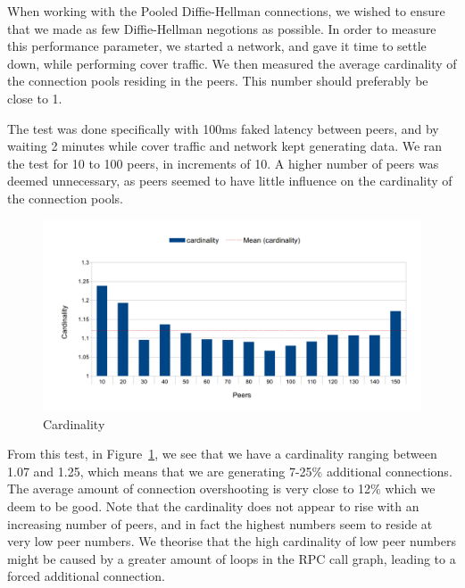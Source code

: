 When working with the Pooled Diffie-Hellman connections, we wished to ensure that we made as few Diffie-Hellman negotions as possible. In order to measure this performance parameter, we started a network, and gave it time to settle down, while performing cover traffic. We then measured the average cardinality of the connection pools residing in the peers. This number should preferably be close to 1.

The test was done specifically with 100ms faked latency between peers, and by waiting 2 minutes while cover traffic and network kept generating data. We ran the test for 10 to 100 peers, in increments of 10. A higher number of peers was deemed unnecessary, as peers seemed to have little influence on the cardinality of the connection pools.

\begin{figure}
\caption{Cardinality}
\label{graph_cardinality}
\includegraphics[width=\textwidth]{../Grapes/DH_pools_cardinality_graph.png}
\end{figure}

From this test, in Figure~\ref{graph_cardinality}, we see that we have a cardinality ranging between 1.07 and 1.25, which means that we are generating 7-25\% additional connections. The average amount of connection overshooting is very close to 12\% which we deem to be good. Note that the cardinality does not appear to rise with an increasing number of peers, and in fact the highest numbers seem to reside at very low peer numbers. We theorise that the high cardinality of low peer numbers might be caused by a greater amount of loops in the RPC call graph, leading to a forced additional connection.